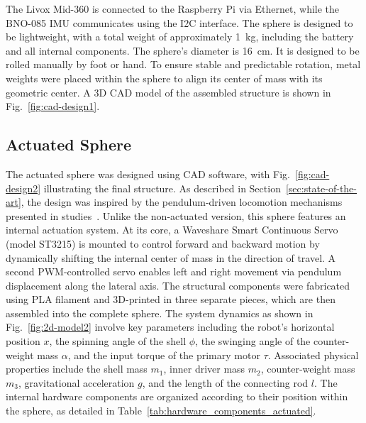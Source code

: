 \documentclass[conference]{IEEEtran}
\begin{document}
The Livox Mid-360 is connected to the Raspberry Pi via Ethernet, while the BNO-085 IMU communicates using the I2C interface. 
The sphere is designed to be lightweight, with a total weight of approximately \SI{1}{\kilo\gram}, including the battery and all internal components. 
The sphere's diameter is \SI{16}{\centi\meter}. 
It is designed to be rolled manually by foot or hand.
To ensure stable and predictable rotation, metal weights were placed within the sphere to align its center of mass with its geometric center. 
A 3D CAD model of the assembled structure is shown in Fig.~\ref{fig:cad-design1}.



\subsection{Actuated Sphere}

The actuated sphere was designed using CAD software, with Fig.~\ref{fig:cad-design2} illustrating the final structure. 
As described in Section~\ref{sec:state-of-the-art}, the design was inspired by the pendulum-driven locomotion mechanisms presented in studies~\cite{roboball, novelsphere}.
Unlike the non-actuated version, this sphere features an internal actuation system. 
At its core, a Waveshare Smart Continuous Servo (model ST3215) is mounted to control forward and backward motion by dynamically shifting the internal center of mass in the direction of travel. 
A second PWM-controlled servo enables left and right movement via pendulum displacement along the lateral axis.
The structural components were fabricated using PLA filament and 3D-printed in three separate pieces, which are then assembled into the complete sphere.
The system dynamics as shown in Fig.~\ref{fig:2d-model2} involve key parameters including the robot’s horizontal position \( x \), the spinning angle of the shell \( \phi \), the swinging angle of the counter-weight mass \( \alpha \), and the input torque of the primary motor \( \tau \). 
Associated physical properties include the shell mass \( m_1 \), inner driver mass \( m_2 \), counter-weight mass \( m_3 \), gravitational acceleration \( g \), and the length of the connecting rod \( l \). 
The internal hardware components are organized according to their position within the sphere, as detailed in Table~\ref{tab:hardware_components_actuated}.
\end{document}
